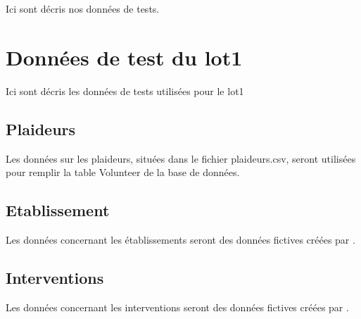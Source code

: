 

Ici sont décris nos données de tests.

\section{Données de test du lot1}
	Ici sont décris les données de tests utilisées pour le lot1

\subsection{Plaideurs}
	Les données sur les plaideurs, situées dans le fichier plaideurs.csv, seront utilisées pour remplir la table Volunteer de la base de données. \\

\subsection{Etablissement}
	Les données concernant les établissements seront des données fictives créées par \nomEquipe.

\subsection{Interventions}
	Les données concernant les interventions seront des données fictives créées par \nomEquipe.

